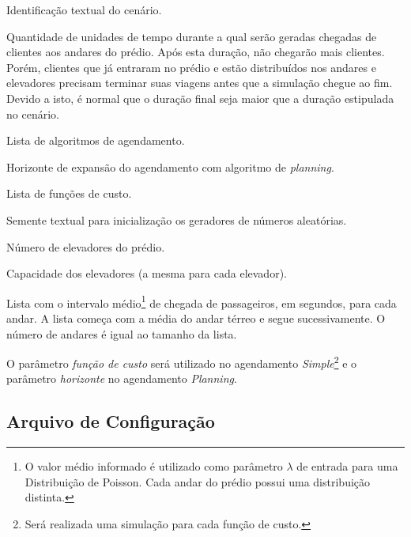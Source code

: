 \begin{description}[leftmargin=!,labelwidth=\widthof{\bfseries Função de Custo}]
  \item[Nome]
  Identificação textual do cenário.

  \item[Duração]
  Quantidade de unidades de tempo durante a qual serão geradas chegadas de
  clientes aos andares do prédio. Após esta duração, não chegarão mais clientes.
  Porém, clientes que já entraram no prédio e estão distribuídos nos andares e
  elevadores precisam terminar suas viagens antes que a simulação chegue ao fim.
  Devido a isto, é normal que o duração final seja maior que a duração
  estipulada no cenário.

  \item[Agendamento]
  Lista de algoritmos de agendamento.

  \item[Horizonte]
  Horizonte de expansão do agendamento com algoritmo de \textit{planning}.

  \item[Função de Custo]
  Lista de funções de custo.

  \item[Semente]
  Semente textual para inicialização os geradores de números aleatórias.

  \item[Elevadores]
  Número de elevadores do prédio.

  \item[Capacidade]
  Capacidade dos elevadores (a mesma para cada elevador).

  \item[Andares]
  Lista com o intervalo médio\footnote{O valor médio informado é utilizado como
  parâmetro $\lambda$ de entrada para uma Distribuição de Poisson. Cada andar do
  prédio possui uma distribuição distinta.} de chegada de passageiros, em
  segundos, para cada andar. A lista começa com a média do andar térreo e segue
  sucessivamente. O número de andares é igual ao tamanho da lista.

\end{description}

O parâmetro \textit{função de custo} será utilizado no agendamento
\textit{Simple}\footnote{Será realizada uma simulação para cada função de
custo.} e o parâmetro \textit{horizonte} no agendamento \textit{Planning}.

\subsection{\label{model:scenario:config}Arquivo de Configuração}

